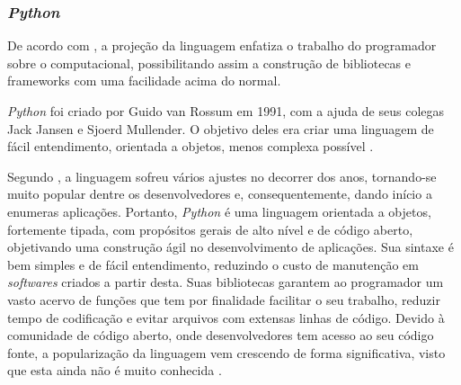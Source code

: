 \subsubsection{\textit{Python}}

De acordo com , a projeção da linguagem enfatiza o trabalho do programador sobre o computacional, possibilitando assim a construção de bibliotecas e frameworks com uma facilidade acima do normal.

\textit{Python} foi criado por Guido van Rossum em 1991, com a ajuda de seus colegas Jack Jansen e Sjoerd Mullender. O objetivo deles era criar uma linguagem de fácil entendimento, orientada a objetos, menos complexa possível \cite{SONGINI2005}.

Segundo , a linguagem sofreu vários ajustes no decorrer dos anos, tornando-se muito popular dentre os desenvolvedores e, consequentemente, dando início a enumeras aplicações. Portanto, \textit{Python} é uma linguagem orientada a objetos, fortemente tipada, com propósitos gerais de alto nível e de código aberto, objetivando uma construção ágil no desenvolvimento de aplicações. Sua sintaxe é bem simples e de fácil entendimento, reduzindo o custo de manutenção em \textit{softwares} criados a partir desta. Suas bibliotecas garantem ao programador um vasto acervo de funções que tem por finalidade facilitar o seu trabalho, reduzir tempo de codificação e evitar arquivos com extensas linhas de código. Devido à comunidade de código aberto, onde desenvolvedores tem acesso ao seu código fonte, a popularização da linguagem vem crescendo de forma significativa, visto que esta ainda não é muito conhecida \cite{SONGINI2005}.